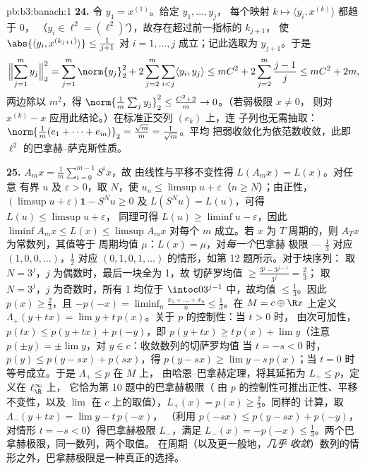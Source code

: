 \begin{solution}{pb:b3:banach:1}
\textbf{24.} 令 $y_1 = x^{(1)}$。给定 $y_1, \dots, y_j$，
每个映射 $k \mapsto \langle y_i, x^{(k)}\rangle$ 都趋于 $0$，
（$y_i \in \ell^2 = (\ell^2)'$），故存在超过前一指标的 $k_{j+1}$，
使 $\abs{\langle y_i,
x^{(k_{j+1})}\rangle} \leq \frac1{j+1}$ 对 $i = 1, \dots,
j$ 成立；记此选取为 $y_{j+1}$。于是
\[
\Bigl\lVert\sum_{j=1}^my_j\Bigr\rVert_2^2
= \sum_{j=1}^m\norm{y_j}_2^2
+ 2\sum_{j=2}^m\sum_{i<j}\langle y_i, y_j\rangle
\leq mC^2 + 2\sum_{j=2}^m\frac{j-1}j
\leq mC^2 + 2m,
\]
两边除以 $m^2$，得 $\norm{\frac1m\sum_jy_j}_2^2 \leq
\frac{C^2 + 2}m \to 0$。（若弱极限 $x \neq 0$，
则对 $x^{(k)} - x$ 应用此结论。）在标准正交列 $(e_k)$ 上，连
子列也无需抽取：$\norm{\frac1m(e_1 + \dots +
e_m)}_2 = \frac{\sqrt m}m = \frac1{\sqrt m}$。平均
把弱收敛化为依范数收敛，此即
$\ell^2$ 的巴拿赫--萨克斯性质。

\textbf{25.} $A_mx = \frac1m\sum_{i=0}^{m-1}S^ix$，故
由线性与平移不变性得 $L(A_mx) = L(x)$。对任意
有界 $u$ 及 $\varepsilon > 0$，取 $N$，使 $u_n \leq
\limsup u + \varepsilon$（$n \geq N$）；由正性，
$(\limsup u + \varepsilon)\mathbf 1 - S^Nu \geq 0$ 及
$L(S^Nu) = L(u)$，可得 $L(u) \leq \limsup u + \varepsilon$，
同理可得 $L(u) \geq \liminf u - \varepsilon$，因此
$\liminf A_mx \leq L(x) \leq \limsup A_mx$ 对每个 $m$ 成立。若
$x$ 为 $T$ 周期的，则 $A_Tx$ 为常数列，其值等于
周期均值 $\mu$：$L(x) = \mu$，对\emph{每一个}巴拿赫
极限 --- $\frac13$ 对应 $(1,0,0,\dots)$，$\frac12$ 对应
$(0,1,0,1,\dots)$ 的情形，如第 12 题所示。对于块序列：
取 $N = 3^j$，$j$ 为偶数时，最后一块全为 1，故
切萨罗均值 $\geq \frac{3^j - 3^{j-1}}{3^j} = \frac23$；
取 $N = 3^j$，$j$ 为奇数时，所有 1 均位于 $\intoc0
{3^{j-1}}$ 中，故均值 $\leq \frac13$。因此 $p(x) \geq
\frac23$，且 $-p(-x) = \liminf_n\frac{x_1 + \dots + x_n}n
\leq \frac13$。在 $M = c \oplus \R x$ 上定义 $\Lambda_+(y +
tx) = \lim y + t\,p(x)$。关于 $p$ 的控制性：当 $t > 0$ 时，
由次可加性，$p(tx) \leq p(y + tx) + p(-y)$，即
$p(y + tx) \geq t\,p(x) + \lim y$（注意 $p(\pm y) = \pm\lim
y$，对 $y \in c$：收敛数列的切萨罗均值
当 $t = -s < 0$ 时，$p(y) \leq p(y -
sx) + p(sx)$，得 $p(y - sx) \geq \lim y - s\,p(x)$；当 $t
= 0$ 时等号成立。于是 $\Lambda_+ \leq p$ 在 $M$ 上，
由哈恩--巴拿赫定理，将其延拓为 $L_+ \leq p$，定义在 $\ell^\infty_\R$ 上，
它恰为第 10 题中的巴拿赫极限（
由 $p$ 的控制性可推出正性、平移不变性，以及
$\lim$ 在 $c$ 上的取值），$L_+(x) = p(x) \geq \frac23$。同样的
计算，取 $\Lambda_-(y + tx) = \lim y - t\,p(-x)$，
（利用 $p(-sx) \leq p(y - sx) + p(-y)$，对情形 $t = -s
< 0$）得巴拿赫极限 $L_-$，满足 $L_-(x) = -p(-x) \leq
\frac13$。两个巴拿赫极限，同一数列，两个取值。
在周期（以及更一般地，\emph{几乎
收敛}）数列的情形之外，巴拿赫极限是一种真正的选择。
\end{solution}
